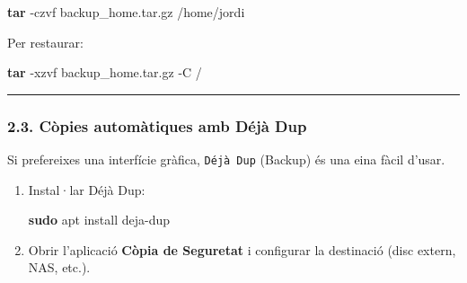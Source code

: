 \documentclass[
  12 pt,
  a4paper,
]{article}
\newenvironment{Shaded}{\begin{snugshade}}{\end{snugshade}}
\newcommand{\AttributeTok}[1]{\textcolor[rgb]{0.13,0.29,0.53}{#1}}
\newcommand{\FunctionTok}[1]{\textcolor[rgb]{0.13,0.29,0.53}{\textbf{#1}}}
\newcommand{\NormalTok}[1]{#1}
\begin{document}
\begin{Shaded}
\begin{Highlighting}[]
\FunctionTok{tar} \AttributeTok{{-}czvf}\NormalTok{ backup\_home.tar.gz /home/jordi}
\end{Highlighting}
\end{Shaded}

Per restaurar:

\begin{Shaded}
\begin{Highlighting}[]
\FunctionTok{tar} \AttributeTok{{-}xzvf}\NormalTok{ backup\_home.tar.gz }\AttributeTok{{-}C}\NormalTok{ /}
\end{Highlighting}
\end{Shaded}

\begin{center}\rule{0.5\linewidth}{0.5pt}\end{center}

\subsubsection{2.3. Còpies automàtiques amb Déjà
Dup}\label{cuxf2pies-automuxe0tiques-amb-duxe9juxe0-dup}

Si prefereixes una interfície gràfica, \texttt{Déjà\ Dup} (Backup) és
una eina fàcil d'usar.

\begin{enumerate}
\def\labelenumi{\arabic{enumi}.}
\item
  Instal·lar Déjà Dup:

\begin{Shaded}
\begin{Highlighting}[]
\FunctionTok{sudo}\NormalTok{ apt install deja{-}dup}
\end{Highlighting}
\end{Shaded}
\item
  Obrir l'aplicació \textbf{Còpia de Seguretat} i configurar la
  destinació (disc extern, NAS, etc.).
\end{enumerate}
\end{document}
